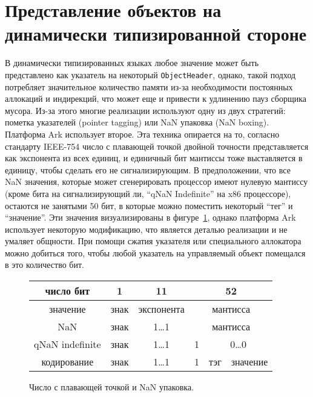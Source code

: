 \documentclass[times,specification,annotation]{itmo-student-thesis}
\begin{document}
\section{Представление объектов на динамически типизированной стороне}\label{nan-boxing-explanation}
В динамически типизированных языках любое значение может быть представлено как указатель на некоторый \texttt{ObjectHeader}, однако, такой подход потребляет значительное количество памяти из-за необходимости постоянных аллокаций и индирекций, что может еще и привести к удлинению пауз сборщика мусора. Из-за этого многие реализации используют одну из двух стратегий: пометка указателей (pointer tagging) или NaN упаковка (NaN boxing). Платформа Ark использует второе. Эта техника опирается на то, согласно стандарту IEEE-754 число с плавающей точкой двойной точности представляется как экспонента из всех единиц, и единичный бит мантиссы тоже выставляется в единицу, чтобы сделать его не сигнализирующим. В предположении, что все NaN значения, которые может сгенерировать процессор имеют нулевую мантиссу (кроме бита на сигнализирующий ли, ``qNaN Indefinite'' на x86 процессоре), остаются не занятыми 50 бит, в которые можно поместить некоторый ``тег'' и ``значение''. Эти значения визуализированы в фигуре~\ref{fig:nan-explain}, однако платформа Ark использует некоторую модификацию, что является деталью реализации и не умаляет общности. При помощи сжатия указателя или специального аллокатора можно добиться того, чтобы любой указатель на управляемый объект помещался в это количество бит.\\
\begin{figure}[!h]
	\caption{Число с плавающей точкой и NaN упаковка.}\label{fig:nan-explain}
	\centering
	\begin{tabular}{|c|c|c|c|c|c|}
		\hline
		число бит & 1 & 11 & \multicolumn{3}{c|}{52} \\
		\hline
		значение & знак & экспонента & \multicolumn{3}{c|}{мантисса} \\
		\hline
		NaN & знак & 1\dots 1 & \multicolumn{3}{c|}{мантисса} \\
		\hline
		qNaN indefinite & знак & 1\dots 1 & 1 & \multicolumn{2}{c|}{0\dots0} \\
		\hline
		кодирование & знак & 1\dots 1 & 1 & тэг & значение \\
		\hline
	\end{tabular}
\end{figure}
\end{document}
